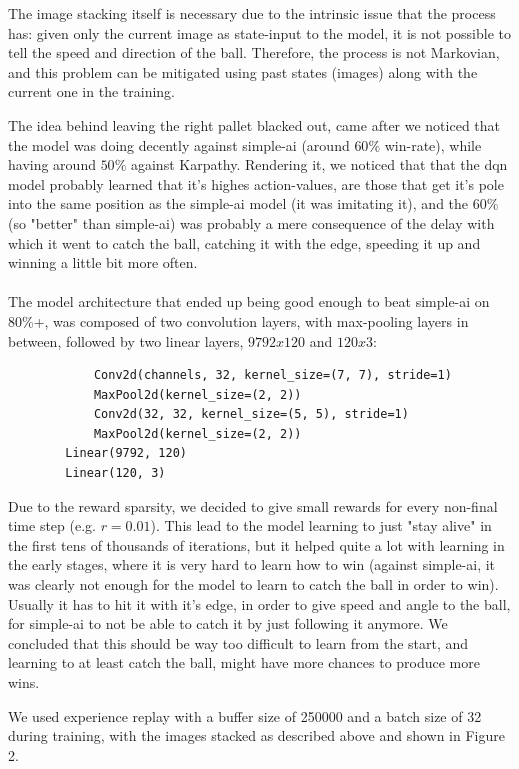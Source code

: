 \noindent
The image stacking itself is necessary due to the intrinsic issue that the process has: given only the current image as state-input to the model, it is not possible to tell the speed and direction of the ball. Therefore, the process is not Markovian, and this problem can be mitigated using past states (images) along with the current one in the training.

\noindent
The idea behind leaving the right pallet blacked out, came after we noticed that the model was doing decently against simple-ai (around $60\%$ win-rate), while having around $50\%$ against Karpathy. Rendering it, we noticed that that the dqn model probably learned that it's highes action-values, are those that get it's pole into the same position as the simple-ai model (it was imitating it), and the 60\% (so "better" than simple-ai) was probably a mere consequence of the delay with which it went to catch the ball, catching it with the edge, speeding it up and winning a little bit more often.\\ \\

\noindent
The model architecture that ended up being good enough to beat simple-ai on 80\%+, was composed of two convolution layers, with max-pooling layers in between, followed by two linear layers, $9792x120$ and $120x3$:

    \begin{verbatim}
            Conv2d(channels, 32, kernel_size=(7, 7), stride=1)
            MaxPool2d(kernel_size=(2, 2))
            Conv2d(32, 32, kernel_size=(5, 5), stride=1)
            MaxPool2d(kernel_size=(2, 2))
		Linear(9792, 120)
		Linear(120, 3)
	\end{verbatim}
	
\noindent
Due to the reward sparsity, we decided to give small rewards for every non-final time step (e.g. $r=0.01$). This lead to the model learning to just "stay alive" in the first tens of thousands of iterations, but it helped quite a lot with learning in the early stages, where it is very hard to learn how to win (against simple-ai, it was clearly not enough for the model to learn to catch the ball in order to win). Usually it has to hit it with it's edge, in order to give speed and angle to the ball, for simple-ai to not be able to catch it by just following it anymore. We concluded that this should be way too difficult to learn from the start, and learning to at least catch the ball, might have more chances to produce more wins.

\noindent
We used experience replay with a buffer size of 250000 and a batch size of 32 during training, with the images stacked as described above and shown in Figure 2.

